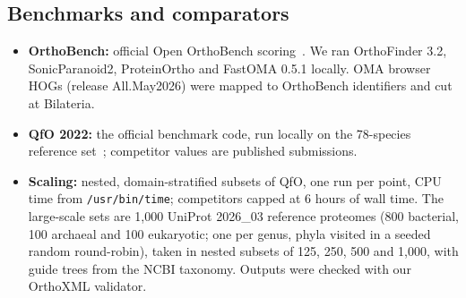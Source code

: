\documentclass[10pt,letterpaper]{article}
\begin{document}
\subsection*{Benchmarks and comparators}
\begin{itemize}
\item \textbf{OrthoBench:} official Open OrthoBench scoring~\cite{emms2020orthobench}. We ran OrthoFinder 3.2, SonicParanoid2, ProteinOrtho and FastOMA 0.5.1 locally. OMA browser HOGs (release All.May2026) were mapped to OrthoBench identifiers and cut at Bilateria.
\item \textbf{QfO 2022:} the official benchmark code, run locally on the 78-species reference set~\cite{altenhoff2024qfo}; competitor values are published submissions.
\item \textbf{Scaling:} nested, domain-stratified subsets of QfO, one run per point, CPU time from \texttt{/usr/bin/time}; competitors capped at 6 hours of wall time. The large-scale sets are 1,000 UniProt 2026\_03 reference proteomes (800 bacterial, 100 archaeal and 100 eukaryotic; one per genus, phyla visited in a seeded random round-robin), taken in nested subsets of 125, 250, 500 and 1,000, with guide trees from the NCBI taxonomy. Outputs were checked with our OrthoXML validator.
\end{itemize}
\end{document}
